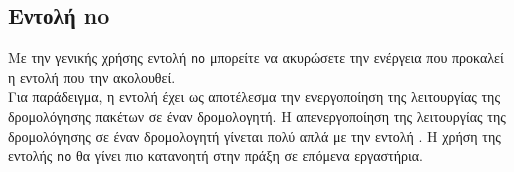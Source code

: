 \documentclass[12pt]{article}
\begin{document}
\begin{flushleft}
\end{flushleft}

\subsection{Εντολή no}
Με την γενικής χρήσης εντολή \texttt{no} μπορείτε να ακυρώσετε την ενέργεια που προκαλεί η εντολή που την ακολουθεί.\\

Για παράδειγμα, η εντολή  έχει ως αποτέλεσμα την ενεργοποίηση της λειτουργίας της δρομολόγησης πακέτων σε έναν δρομολογητή. Η απενεργοποίηση της λειτουργίας της δρομολόγησης σε έναν δρομολογητή γίνεται πολύ απλά με την εντολή . Η χρήση της εντολής \texttt{no} θα γίνει πιο κατανοητή στην πράξη σε επόμενα εργαστήρια.
\end{document}
